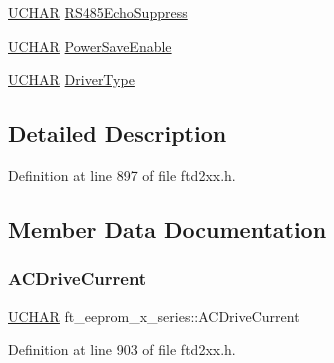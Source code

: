 \begin{DoxyCompactItemize}
\item 
\hyperlink{CatCaloProto40MHz_2inc_2WinTypes_8h_a4f4bb67531a9bf6f0b9c6ad76aeba587}{U\+C\+H\+AR} \hyperlink{structft__eeprom__x__series_a1c3a9dc30091091132b7ec653676f589}{R\+S485\+Echo\+Suppress}
\item 
\hyperlink{CatCaloProto40MHz_2inc_2WinTypes_8h_a4f4bb67531a9bf6f0b9c6ad76aeba587}{U\+C\+H\+AR} \hyperlink{structft__eeprom__x__series_adb0618ee1305d47abec850be8f315ed4}{Power\+Save\+Enable}
\item 
\hyperlink{CatCaloProto40MHz_2inc_2WinTypes_8h_a4f4bb67531a9bf6f0b9c6ad76aeba587}{U\+C\+H\+AR} \hyperlink{structft__eeprom__x__series_a9379ff3b9473a839ebd27a753c3c1b60}{Driver\+Type}
\end{DoxyCompactItemize}


\subsection{Detailed Description}


Definition at line 897 of file ftd2xx.\+h.



\subsection{Member Data Documentation}
\mbox{\label{structft__eeprom__x__series_a62017256a98fdfbd1ec5a662725f9c84}} 
\subsubsection{\texorpdfstring{A\+C\+Drive\+Current}{ACDriveCurrent}}
{\footnotesize\ttfamily \hyperlink{CatCaloProto40MHz_2inc_2WinTypes_8h_a4f4bb67531a9bf6f0b9c6ad76aeba587}{U\+C\+H\+AR} ft\+\_\+eeprom\+\_\+x\+\_\+series\+::\+A\+C\+Drive\+Current}



Definition at line 903 of file ftd2xx.\+h.

\mbox{\label{structft__eeprom__x__series_af0941a8b6cbcfb69a84c9e9bd9751e4e}} 
